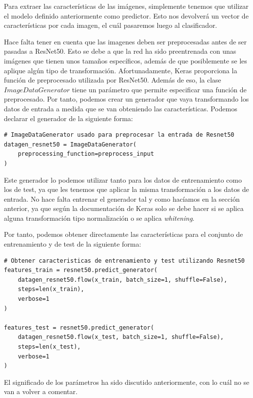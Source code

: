 \documentclass[11pt,a4paper]{article}
\begin{document}
Para extraer las características de las imágenes, simplemente tenemos que utilizar el modelo
definido anteriormente como predictor. Esto nos devolverá un vector de características por
cada imagen, el cuál pasaremos luego al clasificador.

Hace falta tener en cuenta que las imagenes deben ser preprocesadas antes de ser pasadas
a ResNet50. Esto se debe a que la red ha sido preentrenada con unas imágenes que tienen unos
tamaños específicos, además de que posiblemente se les aplique algún tipo de transformación.
Afortunadamente, Keras proporciona la función de preprocesado utilizada por ResNet50. Además
de eso, la clase $ImageDataGenerator$ tiene un parámetro que permite especificar una función
de preprocesado. Por tanto, podemos crear un generador que vaya transformando los datos de
entrada a medida que se van obteniendo las características. Podemos declarar el generador
de la siguiente forma:

\begin{lstlisting}
# ImageDataGenerator usado para preprocesar la entrada de Resnet50
datagen_resnet50 = ImageDataGenerator(
    preprocessing_function=preprocess_input
)
\end{lstlisting}

Este generador lo podemos utilizar tanto para los datos de entrenamiento como los de test,
ya que les tenemos que aplicar la misma transformación a los datos de entrada. No hace falta
entrenar el generador tal y como hacíamos en la sección anterior, ya que según la documentación de Keras
\cite{keras/preprocess} solo se debe hacer si se aplica alguna transformación tipo normalización o
se aplica \textit{whitening}.

Por tanto, podemos obtener directamente las características para el conjunto de entrenamiento y de
test de la siguiente forma:

\begin{lstlisting}
# Obtener caracteristicas de entrenamiento y test utilizando Resnet50
features_train = resnet50.predict_generator(
    datagen_resnet50.flow(x_train, batch_size=1, shuffle=False),
    steps=len(x_train),
    verbose=1
)

features_test = resnet50.predict_generator(
    datagen_resnet50.flow(x_test, batch_size=1, shuffle=False),
    steps=len(x_test),
    verbose=1
)
\end{lstlisting}

El significado de los parámetros ha sido discutido anteriormente, con lo cuál no se van a
volver a comentar.
\end{document}
